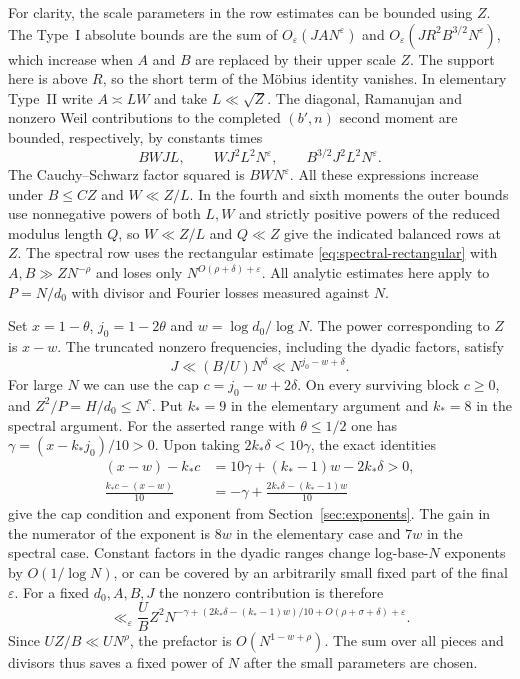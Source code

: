 \documentclass[11pt]{amsart}
\numberwithin{equation}{section}
\theoremstyle{remark}
\begin{document}
For clarity, the scale parameters in the row estimates can be
bounded using \(Z\). The Type~I absolute bounds are the sum of
\(O_\varepsilon(JA N^\varepsilon)\) and
\(O_\varepsilon(JR^2 B^{3/2}N^\varepsilon)\), which increase
when \(A\) and \(B\) are replaced by their upper scale \(Z\).
The support here is above \(R\), so the short term of the M\"obius
identity vanishes. In elementary Type~II write \(A\asymp LW\)
and take \(L\ll \sqrt Z\). The diagonal, Ramanujan and nonzero
Weil contributions to the completed \((b',n)\) second moment
are bounded, respectively, by constants times
\[
   BWJL,\qquad WJ^2L^2 N^\varepsilon,\qquad
   B^{3/2} J^2 L^2 N^\varepsilon.
\]
The Cauchy--Schwarz factor squared is \(BW N^\varepsilon\).
All these expressions increase under \(B\le C Z\) and
\(W\ll Z/L\). In the fourth and sixth moments the outer bounds
use nonnegative powers of both \(L,W\) and strictly positive
powers of the reduced modulus length \(Q\), so \(W\ll Z/L\)
and \(Q\ll Z\) give the indicated balanced rows at \(Z\).
The spectral row uses the rectangular estimate
\eqref{eq:spectral-rectangular} with \(A,B\gg ZN^{-\rho}\) and loses only
\(N^{O(\rho+\delta)+\varepsilon}\). All analytic estimates here
apply to \(P=N/d_0\) with divisor and Fourier losses measured
against \(N\).

Set \(x=1-\theta\), \(j_0=1-2\theta\) and \(w=\log d_0/\log N\).
The power corresponding to \(Z\) is \(x-w\).
The truncated nonzero frequencies, including the dyadic factors,
satisfy
\[
  J\ll (B/U)N^\delta\ll N^{j_0-w+\delta}.
\]
For large \(N\) we can use the cap \(c=j_0-w+2\delta\).
On every surviving block \(c\ge0\), and \(Z^2/P=H/d_0\le N^c\).
Put \(k_*=9\) in the elementary argument and \(k_*=8\) in the
spectral argument. For the asserted range with \(\theta\le1/2\)
one has \(\gamma=(x-k_*j_0)/10>0\). Upon taking
\(2k_*\delta<10\gamma\), the exact identities
\[
 \begin{split}
 (x-w)-k_*c&=10\gamma+(k_*-1)w-2k_*\delta>0,\\
 \frac{k_*c-(x-w)}{10}&=-\gamma+\frac{2k_*\delta-(k_*-1)w}{10}
 \end{split}
\]
give the cap condition and exponent from
Section~\ref{sec:exponents}. The gain in the numerator of the
exponent is \(8w\) in the elementary case and \(7w\) in the spectral
case. Constant factors in the dyadic ranges change log-base-\(N\)
exponents by \(O(1/\log N)\), or can be covered by an arbitrarily
small fixed part of the final \(\varepsilon\). For a fixed
\(d_0,A,B,J\) the nonzero contribution is therefore
\[
 \ll_\varepsilon \frac{U}{B}Z^2
 N^{-\gamma+(2k_*\delta-(k_*-1)w)/10
       +O(\rho+\sigma+\delta)+\varepsilon}.
\]
Since \(UZ/B\ll U N^\rho\), the prefactor is
\(O(N^{1-w+\rho})\). The sum over all pieces and divisors thus
saves a fixed power of \(N\) after the small parameters are chosen.
\end{document}
